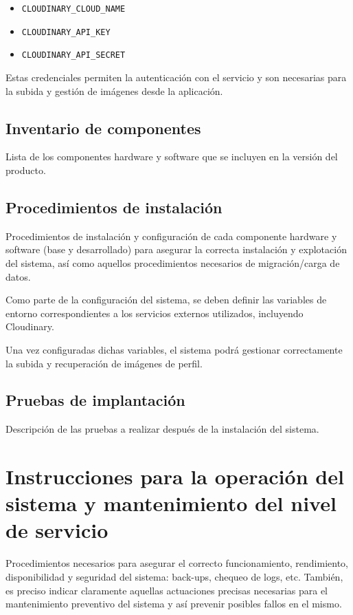 \begin{itemize}
    \item \texttt{CLOUDINARY\_CLOUD\_NAME}
    \item \texttt{CLOUDINARY\_API\_KEY}
    \item \texttt{CLOUDINARY\_API\_SECRET}
\end{itemize}

Estas credenciales permiten la autenticación con el servicio y son necesarias para la subida y gestión de imágenes desde la aplicación.

\subsection{Inventario de componentes}
Lista de los componentes hardware y software que se incluyen en la versión del producto.

\subsection{Procedimientos de instalación}
Procedimientos de instalación y configuración de cada componente hardware y software (base y desarrollado) para asegurar la correcta instalación y explotación del sistema, así como aquellos procedimientos necesarios de migración/carga de datos.

Como parte de la configuración del sistema, se deben definir las variables de entorno correspondientes a los servicios externos utilizados, incluyendo Cloudinary.

Una vez configuradas dichas variables, el sistema podrá gestionar correctamente la subida y recuperación de imágenes de perfil.

\subsection{Pruebas de implantación}
Descripción de las pruebas a realizar después de la instalación del sistema.

\section{Instrucciones para la operación del sistema y mantenimiento del nivel de servicio}
Procedimientos necesarios para asegurar el correcto funcionamiento, rendimiento, disponibilidad y seguridad del sistema: back-ups, chequeo de logs, etc. También, es preciso indicar claramente aquellas actuaciones precisas necesarias para el mantenimiento preventivo del sistema y así prevenir posibles fallos en el mismo.


